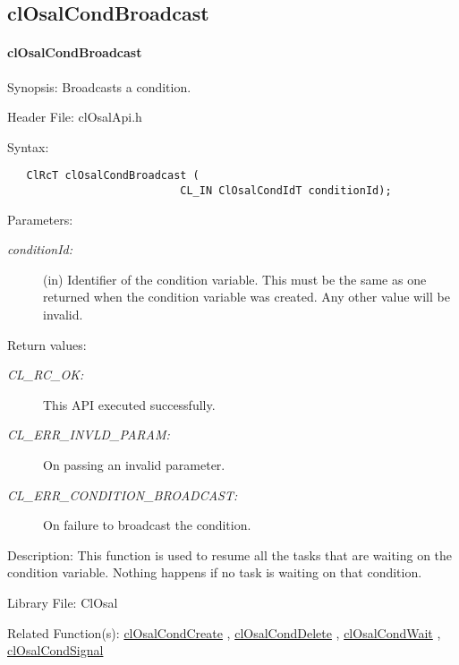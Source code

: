 \subsection{ clOsalCondBroadcast}
\hypertarget{pageosal121}{}\paragraph{cl\-Osal\-Cond\-Broadcast}\label{pageosal121}
\begin{Desc}
\item[Synopsis:]Broadcasts a condition.\end{Desc}
\begin{Desc}
\item[Header File:]clOsalApi.h\end{Desc}
\begin{Desc}
\item[Syntax:]

\footnotesize\begin{verbatim}   ClRcT clOsalCondBroadcast (
                           CL_IN ClOsalCondIdT conditionId);
\end{verbatim}
\normalsize
\end{Desc}
\begin{Desc}
\item[Parameters:]
\begin{description}
\item[{\em condition\-Id:}](in) Identifier of the condition variable. This must be the same as one returned when the condition variable was created. Any other value will be invalid.\end{description}
\end{Desc}
\begin{Desc}
\item[Return values:]
\begin{description}
\item[{\em CL\_\-RC\_\-OK:}]This API executed successfully. \item[{\em CL\_\-ERR\_\-INVLD\_\-PARAM:}]On passing an invalid parameter. \item[{\em CL\_\-ERR\_\-CONDITION\_\-BROADCAST:}]On failure to broadcast the condition.\end{description}
\end{Desc}
\begin{Desc}
\item[Description:]This function is used to resume all the tasks that are waiting on the condition variable. Nothing happens if no task is waiting on that condition.\end{Desc}
\begin{Desc}
\item[Library File:]Cl\-Osal\end{Desc}
\begin{Desc}
\item[Related Function(s):]\hyperlink{pageosal118}{cl\-Osal\-Cond\-Create} , \hyperlink{pageosal119}{cl\-Osal\-Cond\-Delete} , 
\hyperlink{pageosal120}{cl\-Osal\-Cond\-Wait} , \hyperlink{pageosal122}{cl\-Osal\-Cond\-Signal} \end{Desc}

